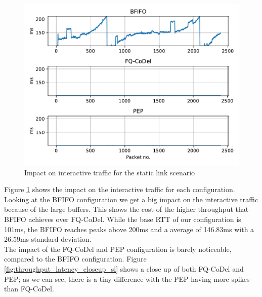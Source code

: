 \documentclass[a4paper,english, 11pt]{report}
\begin{document}
\begin{figure}[!h!] %
	\centering
	\includegraphics[scale=0.70]{../diagrams/witestlab/throughput/throughput_latency_sl.pdf}
  	\caption{Impact on interactive traffic for the static link scenario}
  	\label{fig:throughput_latency_sl}
\end{figure}

Figure \ref{fig:throughput_latency_sl} shows the impact on the interactive traffic for each configuration. 
Looking at the BFIFO configuration we get a big impact on the interactive traffic because of the large buffers. This shows the cost of the higher throughput that BFIFO achieves over FQ-CoDel. While the base RTT of our configuration is 101ms, the BFIFO reaches peaks above 200ms and a average of 146.83ms with a 26.59ms standard deviation.\\

The impact of the FQ-CoDel and PEP configuration is barely noticeable, compared to the BFIFO configuration. Figure \ref{fig:throughput_latency_closeup_sl} shows a close up of both FQ-CoDel and PEP; as we can see, there is a tiny difference with the PEP having more spikes than FQ-CoDel.\\
\end{document}
